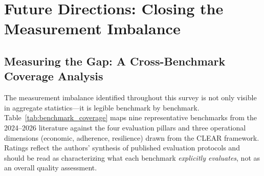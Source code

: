 \section{Future Directions: Closing the Measurement Imbalance}
\label{sec:future}

\subsection{Measuring the Gap: A Cross-Benchmark Coverage Analysis}

The measurement imbalance identified throughout this survey is not only visible in aggregate statistics---it is legible benchmark by benchmark. Table~\ref{tab:benchmark_coverage} maps nine representative benchmarks from the 2024--2026 literature against the four evaluation pillars and three operational dimensions (economic, adherence, resilience) drawn from the CLEAR framework. Ratings reflect the authors' synthesis of published evaluation protocols and should be read as characterizing what each benchmark \emph{explicitly evaluates}, not as an overall quality assessment.

